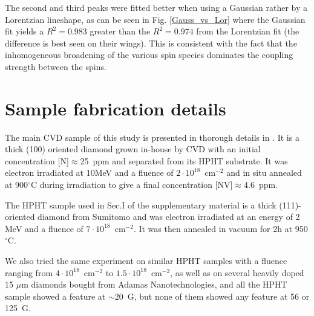 \documentclass[9pt,twocolumn,twoside]{revtex4-1}
\begin{document}
The second and third peaks were fitted better when using a Gaussian rather by a Lorentzian lineshape, as can be seen in Fig. \ref{Gauss_vs_Lor} where the Gaussian fit yields a $R^2=0.983$ greater than the $R^2=0.974$ from the Lorentzian fit (the difference is best seen on their wings). This is consistent with the fact that the inhomogeneous broadening of the various spin species dominates the coupling strength between the spins.

\section{Sample fabrication details}
The main CVD sample of this study is presented in thorough details in \citep{TALLAIRE2020421}. It is a thick (100) oriented diamond grown in-house by CVD with an initial concentration [N]$\approx$25~ppm and separated from its HPHT substrate. It was electron irradiated at 10MeV and a fluence of $2\cdot 10^{18}$~cm$^{-2}$ and in situ annealed at 900$^\circ$C during irradiation to give a final concentration [NV]$\approx$4.6~ppm.

The HPHT sample used in Sec.I of the supplementary material is a thick (111)-oriented diamond from Sumitomo and was electron irradiated at an energy of 2 MeV and a fluence of $7\cdot 10^{18}$~cm$^{-2}$. It was then annealed in vacuum for 2h at 950$^\circ$C.

We also tried the same experiment on similar HPHT samples with a fluence ranging from $4\cdot 10^{18}$~cm$^{-2}$ to $1.5\cdot 10^{18}$~cm$^{-2}$, as well as on several heavily doped 15 $\mu$m diamonds bought from Adamas Nanotechnologies, and all the HPHT sample showed a feature at $\sim$20~G, but none of them showed any feature at 56 or 125~G.
\end{document}
